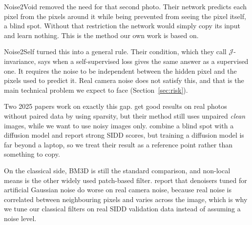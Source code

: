 \documentclass[11pt]{article}
\begin{document}
Noise2Void \citep{krull2019noise2void} removed the need for that second photo. Their
network predicts each pixel from the pixels around it while being prevented from seeing the
pixel itself, a blind spot. Without that restriction the network would simply copy its
input and learn nothing. This is the method our own work is based on.

Noise2Self \citep{batson2019noise2self} turned this into a general rule. Their condition,
which they call $\mathcal{J}$-invariance, says when a self-supervised loss gives the same
answer as a supervised one. It requires the noise to be independent between the hidden
pixel and the pixels used to predict it. Real camera noise does not satisfy this, and that
is the main technical problem we expect to face (Section~\ref{sec:risk}).

Two 2025 papers work on exactly this gap. \citet{chihaoui2025sparsity} get good results on
real photos without paired data by using sparsity, but their method still uses unpaired
\emph{clean} images, while we want to use noisy images only. \citet{cheng2025blindspot}
combine a blind spot with a diffusion model and report strong SIDD scores, but training a
diffusion model is far beyond a laptop, so we treat their result as a reference point
rather than something to copy.

On the classical side, BM3D \citep{dabov2007bm3d} is still the standard comparison, and
non-local means \citep{buades2011nlm} is the other widely used patch-based filter.
\citet{zhou2020awgn} report that denoisers tuned for artificial Gaussian noise do worse on
real camera noise, because real noise is correlated between neighbouring pixels and varies
across the image, which is why we tune our classical filters on real SIDD validation data
instead of assuming a noise level.
\end{document}
